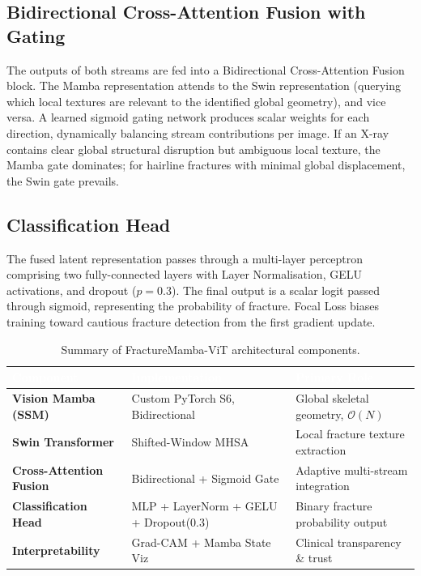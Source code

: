 \documentclass[12pt, a4paper]{article}
\begin{document}
\subsection{Bidirectional Cross-Attention Fusion with Gating}

The outputs of both streams are fed into a Bidirectional Cross-Attention Fusion block. The Mamba
representation attends to the Swin representation (querying which local textures are relevant to
the identified global geometry), and vice versa. A learned sigmoid gating network produces scalar
weights for each direction, dynamically balancing stream contributions per image. If an X-ray
contains clear global structural disruption but ambiguous local texture, the Mamba gate dominates;
for hairline fractures with minimal global displacement, the Swin gate prevails.

\subsection{Classification Head}

The fused latent representation passes through a multi-layer perceptron comprising two
fully-connected layers with Layer Normalisation, GELU activations, and dropout ($p=0.3$). The
final output is a scalar logit passed through sigmoid, representing the probability of fracture.
Focal Loss biases training toward cautious fracture detection from the first gradient update.

\vspace{0.5em}

\begin{table}[H]
\centering
\caption{Summary of FractureMamba-ViT architectural components.}
\label{tab:architecture}
\begin{tabularx}{\textwidth}{>{\bfseries}lXX}
\toprule
\rowcolor{NavyBlue}
\textcolor{white}{Component} &
\textcolor{white}{Implementation} &
\textcolor{white}{Primary Role} \\
\midrule
Vision Mamba (SSM)      & Custom PyTorch S6, Bidirectional      & Global skeletal geometry, $\mathcal{O}(N)$ \\
Swin Transformer        & Shifted-Window MHSA                   & Local fracture texture extraction \\
Cross-Attention Fusion  & Bidirectional + Sigmoid Gate          & Adaptive multi-stream integration \\
Classification Head     & MLP + LayerNorm + GELU + Dropout(0.3) & Binary fracture probability output \\
Interpretability        & Grad-CAM + Mamba State Viz            & Clinical transparency \& trust \\
\bottomrule
\end{tabularx}
\end{table}
\end{document}

